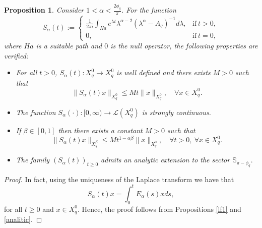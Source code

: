 \documentclass[12pt,reqno]{amsart}
\newtheorem{pr}{Proposition}
\newcommand{\Le}{\mathcal{L}}%
\begin{document}
	\begin{pr}\label{lf2} Consider $1<\alpha<\frac{2\phi_q}{\pi}$. For the function 
		\begin{equation*}
			S_{\alpha}(t):=\left\{\begin{array}{ll}\displaystyle \frac{1}{2\pi i}\int_{Ha}e^{\lambda t}\lambda^{\alpha-2}(\lambda^{\alpha}-A_{q})^{-1}d\lambda, &  \mbox{if} ~  t> 0,\\
				0, &  \mbox{if} ~ t=0,\end{array}\right.
		\end{equation*}
		where $Ha$ is a suitable path and $0$ is the null operator, the following properties are verified:
		\begin{itemize}
			\item[$(i)$] For all $t>0$, $S_{\alpha}(t):X^{0}_{q}\to X^{0}_{q}$ is well defined and there exists $M>0$ such that 
			$$\|S_{\alpha}(t)x\|_{X^{0}_{q}}\leq Mt\|x\|_{X^{0}_{q}}, \quad  \forall x\in X^{0}_{q}.$$ 
			\item[$(ii)$] The function $S_{\alpha}(\cdot ):[0,\infty)\rightarrow \Le(X^{0}_{q})$ is strongly continuous.
			\item[$(iii)$] If  $\beta\in[0, 1]$ then there exists a constant $M>0$ such that 
			$$\|S_{\alpha}(t)x\|_{X^{\beta}_{q}}\leq M t^{1-\alpha\beta}\|x\|_{X^{0}_{q}},\quad \forall t>0, \ \forall x\in X^{0}_{q}.$$
			\item[$(iv)$] The family $(S_\alpha(t))_{t\ge0}$ admits an analytic extension to the sector $\mathbb{S}_{\pi-\phi_q}.$
		\end{itemize} 
	\end{pr}
	
	\begin{proof}
		In fact, using the uniqueness of the Laplace transform we have that 
		$$S_{\alpha}(t)x=\int_{0}^{t}E_{\alpha}(s)xds,$$
		for all $t\ge0$ and $x\in X^{0}_{q}$. Hence, the proof follows from Propositions \ref{lf1} and \ref{analitic}.
	\end{proof}
	
\end{document}
